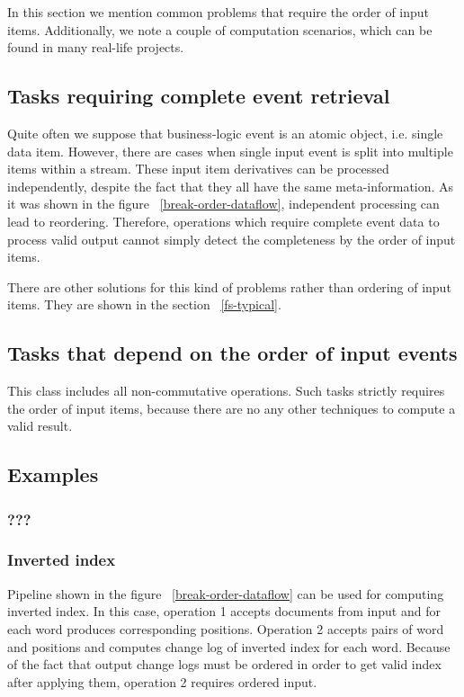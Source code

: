 
\label {fs-tasks}

In this section we mention common problems that require the order of input items. Additionally, we note a couple of computation scenarios, which can be found in many real-life projects.

\subsection{Tasks requiring complete event retrieval}
Quite often we suppose that business-logic event is an atomic object, i.e. single data item. However, there are cases when single input event is split into multiple items within a stream. These input item derivatives can be processed independently, despite the fact that they all have the same meta-information. As it was shown in the figure ~\ref{break-order-dataflow}, independent processing can lead to reordering. Therefore, operations which require complete event data to process valid output cannot simply detect the completeness by the order of input items.

There are other solutions for this kind of problems rather than ordering of input items. They are shown in the section ~\ref{fs-typical}. 

\subsection{Tasks that depend on the order of input events}
This class includes all non-commutative operations. Such tasks strictly requires the order of input items, because there are no any other techniques to compute a valid result.

\subsection{Examples}

\subsubsection{???}

\subsubsection{Inverted index}
Pipeline shown in the figure ~\ref{break-order-dataflow} can be used for computing inverted index. In this case, operation 1 accepts documents from input and for each word produces corresponding positions. Operation 2 accepts pairs of word and positions and computes change log of inverted index for each word. Because of the fact that output change logs must be ordered in order to get valid index after applying them, operation 2 requires ordered input. 
